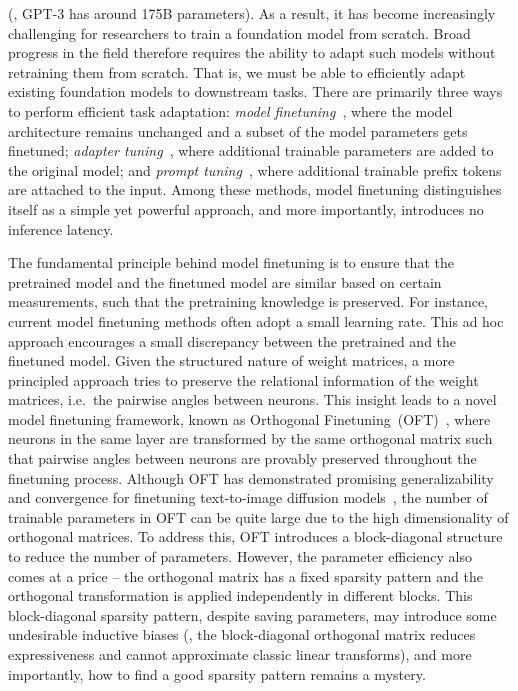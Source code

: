 (\eg, GPT-3 has around 175B parameters). As a result, it has become increasingly challenging for researchers to train a foundation model from scratch. Broad progress in the field therefore requires the ability to adapt such models without retraining them from scratch. 
That is, we must be able  
to efficiently adapt existing foundation models to downstream tasks. There are primarily three ways to perform efficient task adaptation: \emph{model finetuning}~\cite{hulora2022,zaken2022bitfit,guo2020parameter,raffel2020exploring,qiu2023controlling,zhang2022adaptive,chavan2023one}, where the model architecture remains unchanged and a subset of the model parameters gets finetuned; \emph{adapter tuning}~\cite{rebuffi2017learning,houlsby2019parameter,pfeiffer2020adapterfusion,lin2020exploring,he2021towards}, where additional trainable parameters are added to the original model; and \emph{prompt tuning}~\cite{li2021prefix,lester2021power}, where additional trainable prefix tokens are attached to the input. Among these methods, model finetuning distinguishes itself as a simple yet powerful approach, and more importantly, introduces no inference latency.

\vspace{-0.6mm}

The fundamental principle behind model finetuning is to ensure that the pretrained model and the finetuned model are similar based on certain measurements, such that the pretraining knowledge is preserved. For instance, current model finetuning methods often adopt a small learning rate. This ad hoc approach encourages a small discrepancy between the pretrained and the finetuned model. Given the structured nature of weight matrices, a more principled approach  tries to preserve the relational information of the weight matrices, i.e.~the pairwise angles between neurons. This insight leads to a novel model finetuning framework, known as Orthogonal Finetuning~(OFT)~\cite{qiu2023controlling}, where neurons in the same layer are transformed by the same orthogonal matrix such that pairwise angles between neurons are provably preserved throughout the finetuning process. Although OFT has demonstrated promising generalizability and convergence for finetuning text-to-image diffusion models~\cite{qiu2023controlling}, the number of trainable parameters in OFT can be quite large due to the high dimensionality of orthogonal matrices. To address this, OFT introduces a block-diagonal structure to reduce the number of parameters. However, the parameter efficiency also comes at a price -- the orthogonal matrix has a fixed sparsity pattern and the orthogonal transformation is applied independently in different blocks. This block-diagonal sparsity pattern, despite saving parameters, may introduce some undesirable inductive biases (\eg, the block-diagonal orthogonal matrix reduces expressiveness and cannot approximate classic linear transforms), and more importantly, how to find a good sparsity pattern remains a mystery.


